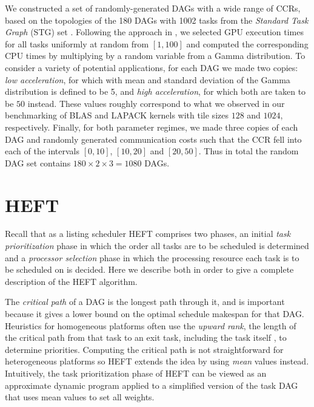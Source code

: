 \documentclass[runningheads]{llncs}
\begin{document}
We constructed a set of randomly-generated DAGs with a wide range of CCRs, based on the topologies of the 180 DAGs with 1002 tasks from the {\em Standard Task Graph} (STG) set \cite{Tobita2002}. Following the approach in \cite{canon2018}, we selected GPU execution times for all tasks uniformly at random from $[1, 100]$ and computed the corresponding CPU times by multiplying by a random variable from a Gamma distribution. To consider a variety of potential applications, for each DAG we made two copies: {\em low acceleration}, for which with mean and standard deviation of the Gamma distribution is defined to be 5, and {\em high acceleration}, for which both are taken to be $50$ instead. These values roughly correspond to what we observed in our benchmarking of BLAS and LAPACK kernels with tile sizes $128$ and $1024$, respectively. Finally, for both parameter regimes, we made three copies of each DAG and randomly generated communication costs such that the CCR fell into each of the intervals $[0, 10]$, $[10, 20]$ and $[20, 50]$. Thus in total the random DAG set contains $180 \times 2 \times 3 = 1080$ DAGs.  



\section{HEFT}
\label{sect.HEFT}

Recall that as a listing scheduler HEFT comprises two phases, an initial {\em task prioritization} phase in which the order all tasks are to be scheduled is determined and a {\em processor selection} phase in which the processing resource each task is to be scheduled on is decided. Here we describe both in order to give a complete description of the HEFT algorithm.  

The {\em critical path} of a DAG is the longest path through it, and is important because it gives a lower bound on the optimal schedule makespan for that DAG. Heuristics for homogeneous platforms often use the {\em upward rank}, the length of the critical path from that task to an exit task, including the task itself \cite{topcuoglu2002performance}, to determine priorities. Computing the critical path is not straightforward for heterogeneous platforms so HEFT extends the idea by using {\em mean} values instead. Intuitively, the task prioritization phase of HEFT can be viewed as an approximate dynamic program applied to a simplified version of the task DAG that uses mean values to set all weights.
\end{document}
